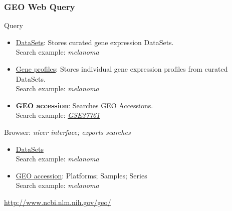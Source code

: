 \documentclass{beamer}
\begin{document}
\begin{frame}
  \frametitle{GEO Web Query}
  
  Query
  
  \begin{itemize}
  \item \href{http://www.ncbi.nlm.nih.gov/gds/}{DataSets}: Stores curated gene expression DataSets. \\
    Search example: \textit{melanoma}
  \item \href{http://www.ncbi.nlm.nih.gov/geoprofiles/}{Gene profiles}: Stores individual gene expression profiles from curated DataSets. \\
    Search example: \textit{melanoma}
  \item \href{http://www.ncbi.nlm.nih.gov/geo/query/acc.cgi}{\textbf{GEO accession}}: Searches GEO Accessions. \\ 
    Search example: \href{http://www.ncbi.nlm.nih.gov/geo/query/acc.cgi?acc=GSE37761}{\textit{GSE37761}}
  \end{itemize}

  \bigskip
  
  Browser: \textit{nicer interface; exports searches}

  \begin{itemize}
  \item \href{http://www.ncbi.nlm.nih.gov/sites/GDSbrowser}{DataSets} \\
    Search example: \textit{melanoma}
  \item \href{http://www.ncbi.nlm.nih.gov/geo/browse/}{GEO accession}: Platforms; Samples; Series \\
    Search example: \textit{melanoma}
  \end{itemize}


  \begin{center}
    \url{http://www.ncbi.nlm.nih.gov/geo/}
  \end{center}  

\end{frame}

\end{document}
